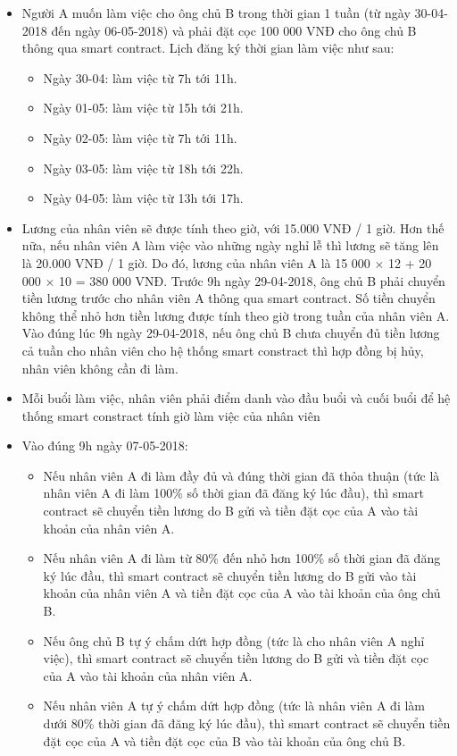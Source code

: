 \documentclass[12pt,a4paper,oneside]{article}
\begin{document}
\begin{itemize}
	\item Người A muốn làm việc cho ông chủ B trong thời gian 1 tuần (từ ngày 30-04-2018 đến ngày 06-05-2018) và phải đặt cọc 100 000 VNĐ cho ông chủ B thông qua smart contract. Lịch đăng ký thời gian làm việc như sau:
	\begin{itemize}
		\item Ngày 30-04: làm việc từ 7h tới 11h.
		\item Ngày 01-05: làm việc từ 15h tới 21h.
		\item Ngày 02-05: làm việc từ 7h tới 11h.
		\item Ngày 03-05: làm việc từ 18h tới 22h.
		\item Ngày 04-05: làm việc từ 13h tới 17h.
	\end{itemize}
	\item Lương của nhân viên sẽ được tính theo giờ, với 15.000 VNĐ / 1 giờ. Hơn thế nữa, nếu nhân viên A làm việc vào những ngày nghỉ lễ thì lương sẽ tăng lên là 20.000 VNĐ / 1 giờ. Do đó, lương của nhân viên A là 15 000 $\times$ 12 + 20 000 $\times$ 10 = 380 000 VNĐ. Trước 9h  ngày 29-04-2018, ông chủ B phải chuyển tiền lương trước cho nhân viên A  thông qua smart contract. Số tiền chuyển không thể nhỏ hơn tiền lương được tính theo giờ trong tuần của nhân viên A. Vào đúng lúc 9h  ngày 29-04-2018, nếu ông chủ B chưa chuyển đủ tiền lương cả tuần cho nhân viên cho hệ thống smart constract thì hợp đồng bị hủy, nhân viên không cần đi làm.
	\item  Mỗi buổi làm việc, nhân viên phải điểm danh vào đầu buổi và cuối buổi để hệ thống smart constract tính giờ làm việc của nhân viên
	\item Vào đúng 9h ngày 07-05-2018:
	\begin{itemize}
		\item Nếu nhân viên A đi làm đầy đủ và đúng thời gian đã thỏa thuận (tức là nhân viên A đi làm 100\% số thời gian đã đăng ký lúc đầu), thì smart contract sẽ chuyển tiền lương do B gửi và tiền đặt cọc của A vào tài khoản của nhân viên A.
		\item Nếu nhân viên A đi làm từ 80\% đến nhỏ hơn 100\% số thời gian đã đăng ký lúc đầu, thì smart contract sẽ chuyển tiền lương do B gửi vào tài khoản của nhân viên A và tiền đặt cọc của A vào tài khoản của ông chủ B.
		\item Nếu ông chủ B tự ý chấm dứt hợp đồng (tức là cho nhân viên A nghỉ việc), thì smart contract sẽ chuyển tiền lương do B gửi và tiền đặt cọc của A vào tài khoản của nhân viên A.
		
		\item Nếu nhân viên A tự ý chấm dứt hợp đồng (tức là nhân viên A đi làm dưới 80\% thời gian đã đăng ký lúc đầu), thì smart contract sẽ chuyển tiền đặt cọc của A và tiền đặt cọc của B vào tài khoản của ông chủ B. 
	\end{itemize}
\end{itemize}
\end{document}
